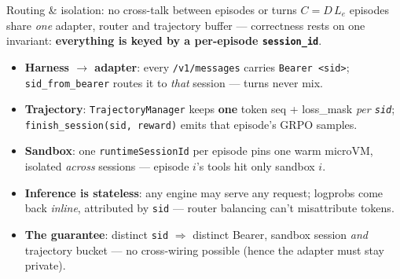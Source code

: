 \documentclass[aspectratio=169]{beamer}
\begin{document}
\begin{frame}{Routing \& isolation: no cross-talk between episodes or turns}
  \footnotesize $C=D\,L_e$ episodes share \emph{one} adapter, router and trajectory buffer ---
  correctness rests on one invariant: \textbf{everything is keyed by a per-episode \texttt{session\_id}}.
  \begin{center}
  \end{center}
  \vspace{-0.45em}
  \begin{itemize}\setlength\itemsep{0.03em}
    \item \textbf{Harness $\to$ adapter}: every \texttt{/v1/messages} carries \texttt{Bearer <sid>};
      \texttt{sid\_from\_bearer} routes it to \emph{that} session --- turns never mix.
    \item \textbf{Trajectory}: \texttt{TrajectoryManager} keeps \textbf{one} token seq + loss\_mask
      \emph{per \texttt{sid}}; \texttt{finish\_session(sid, reward)} emits that episode's GRPO samples.
    \item \textbf{Sandbox}: one \texttt{runtimeSessionId} per episode pins one warm microVM, isolated
      \emph{across} sessions --- episode $i$'s tools hit only sandbox $i$.
    \item \textbf{Inference is stateless}: any engine may serve any request; logprobs come back
      \emph{inline}, attributed by \texttt{sid} --- router balancing can't misattribute tokens.
    \item \textbf{The guarantee}: distinct \texttt{sid} $\Rightarrow$ distinct Bearer, sandbox session
      \emph{and} trajectory bucket --- no cross-wiring possible (hence the adapter must stay private).
  \end{itemize}
\end{frame}
\end{document}
